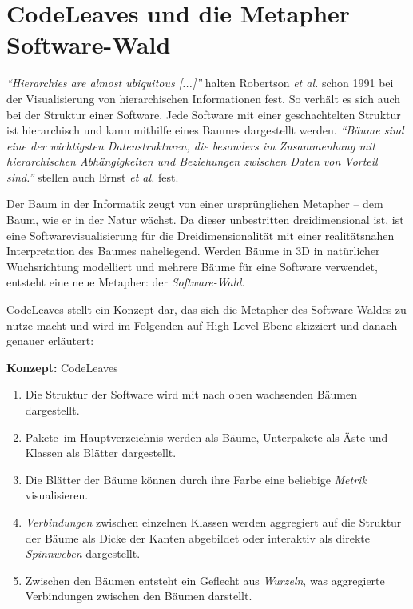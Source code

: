 \section{CodeLeaves und die Metapher Software-Wald}
\label{sec:idea}

\emph{``Hierarchies are almost ubiquitous [...]''} \cite{robertson1991cone} halten Robertson \emph{et al.}
 schon 1991 bei der Visualisierung von hierarchischen Informationen fest. So verhält es sich auch bei der Struktur einer Software. Jede Software mit einer geschachtelten Struktur ist hierarchisch und kann mithilfe eines Baumes dargestellt werden. \emph{"`Bäume sind eine der wichtigsten Datenstrukturen, die besonders im Zusammenhang mit hierarchischen Abhängigkeiten und Beziehungen zwischen Daten von Vorteil sind."'} \cite{ernst2016grundkurs} stellen auch Ernst \emph{et al.} fest.

Der Baum in der Informatik zeugt von einer ursprünglichen Metapher -- dem Baum, wie er in der Natur wächst. Da dieser unbestritten dreidimensional ist, ist eine Softwarevisualisierung für die Dreidimensionalität mit einer realitätsnahen Interpretation des Baumes naheliegend. Werden Bäume in 3D in natürlicher Wuchsrichtung modelliert und mehrere Bäume für eine Software verwendet, entsteht eine neue Metapher: der \emph{Software-Wald}.

CodeLeaves stellt ein Konzept dar, das sich die Metapher des Software-Waldes zu nutze macht und wird im Folgenden auf High-Level-Ebene skizziert und danach genauer erläutert:

\begin{titlebox}{\textbf{Konzept:} CodeLeaves}
  \begin{enumerate}[leftmargin=1em]
    \item Die Struktur der Software wird mit nach oben wachsenden Bäumen dargestellt.
    \item Pakete\ im Hauptverzeichnis werden als Bäume, Unterpakete als Äste und Klassen als Blätter dargestellt.
    \item Die Blätter der Bäume können durch ihre Farbe eine beliebige \textit{Metrik}\footnotemark[1]{} visualisieren.
    \item \textit{Verbindungen}\footnotemark[2]{} zwischen einzelnen Klassen werden aggregiert auf die Struktur der Bäume als Dicke der Kanten abgebildet oder interaktiv als direkte \emph{Spinnweben} dargestellt.
    \item Zwischen den Bäumen entsteht ein Geflecht aus \emph{Wurzeln}, was aggregierte Verbindungen zwischen den Bäumen darstellt.
  \end{enumerate}
\end{titlebox}

